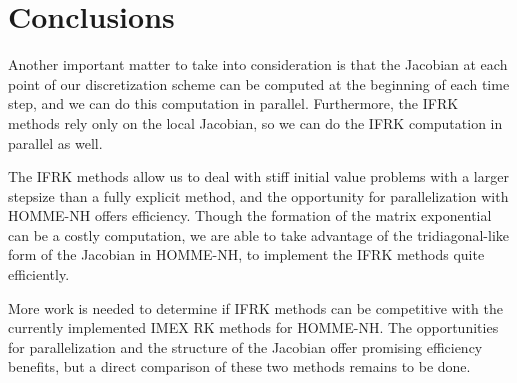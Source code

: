 \documentclass{csri19}
\begin{document}
\section{Conclusions}
Another important matter to take into consideration is that the Jacobian 
at each point of our discretization scheme can be computed at the 
beginning of each time step, and we can do this computation in parallel. 
Furthermore, the IFRK methods rely only on the local Jacobian, so we can 
do the IFRK computation in parallel as well.

The IFRK methods allow us to deal with stiff initial value problems with a 
larger stepsize than a fully explicit method, and the opportunity for 
parallelization with HOMME-NH offers efficiency. Though the formation of 
the matrix exponential can be a costly computation, we are able to take 
advantage of the tridiagonal-like form of the Jacobian in HOMME-NH, to 
implement the IFRK methods quite efficiently.

More work is needed to determine if IFRK methods can be competitive with 
the currently implemented IMEX RK methods for HOMME-NH. The opportunities 
for parallelization and the structure of the Jacobian offer promising 
efficiency benefits, but a direct comparison of these two methods remains 
to be done.




%
\end{document}
